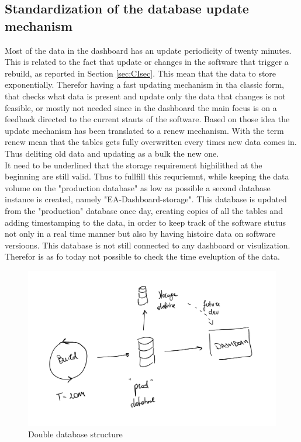\documentclass[../main.tex]{subfiles}
\begin{document}
\subsection{Standardization of the database update mechanism}
Most of the data in the dashboard has an update periodicity of twenty minutes. This is related to the fact that update or changes in the software that trigger a rebuild, as reported in Section \ref{sec:CIsec}. This mean that the data to store exponentially. Therefor having a fast updating mechanism in tha classic form, that checks what data is present and update only the data that changes is not feasible, or mostly not needed since in the dashboard the main focus is on a feedback directed to the current stauts of the software.
Based on those idea the update mechanism has been translated to a renew mechanism. With the term renew mean that the tables gets fully overwritten every times new data comes in. Thus deliting old data and updating as a bulk the new one.\\
It need to be underlined that the storage requirement highilithed at the beginning are still valid. Thus to fullfill this requriemnt, while keeping the data volume on the "production database" as low as possible a second database instance is created, namely "EA-Dashboard-storage". This database is updated from the "production" database once day, creating copies of all the tables and adding timestamping to the data, in order to keep track of the software stutus not only in a real time manner but also by having histoirc data on software versioons. This database is not still connected to any dashboard or visulization. Therefor is as fo today not possible to check the time eveluption of the data. 
\begin{figure}
    \centering
    \includegraphics[width=\linewidth]{images_folder/dual_db.png}
    \caption{Double database structure}
    \label{fig:dds}
\end{figure}
\end{document}
